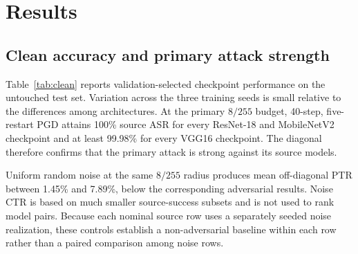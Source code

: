 \documentclass[10pt]{article}
\begin{document}
\section{Results}
\subsection{Clean accuracy and primary attack strength}
Table~\ref{tab:clean} reports validation-selected checkpoint performance on the untouched test set. Variation across the three training seeds is small relative to the differences among architectures. At the primary $8/255$ budget, 40-step, five-restart PGD attains 100\% source ASR for every ResNet-18 and MobileNetV2 checkpoint and at least 99.98\% for every VGG16 checkpoint. The diagonal therefore confirms that the primary attack is strong against its source models.

Uniform random noise at the same $8/255$ radius produces mean off-diagonal PTR between 1.45\% and 7.89\%, below the corresponding adversarial results. Noise CTR is based on much smaller source-success subsets and is not used to rank model pairs. Because each nominal source row uses a separately seeded noise realization, these controls establish a non-adversarial baseline within each row rather than a paired comparison among noise rows.

\begin{table}[t]
\centering
\caption{Clean test accuracy (\%) by training seed. The final column is the mean and sample standard deviation over three checkpoints.}
\label{tab:clean}
\end{table}

\begin{table}[t]
\centering
\caption{Mean source ASR (\%) over three seeds.}
\label{tab:asr}
\end{table}
\end{document}
